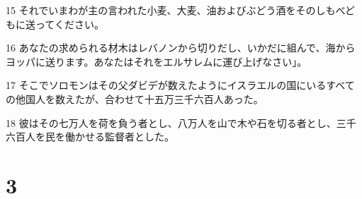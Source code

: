 \par 15 それでいまわが主の言われた小麦、大麦、油およびぶどう酒をそのしもべどもに送ってください。
\par 16 あなたの求められる材木はレバノンから切りだし、いかだに組んで、海からヨッパに送ります。あなたはそれをエルサレムに運び上げなさい」。
\par 17 そこでソロモンはその父ダビデが数えたようにイスラエルの国にいるすべての他国人を数えたが、合わせて十五万三千六百人あった。
\par 18 彼はその七万人を荷を負う者とし、八万人を山で木や石を切る者とし、三千六百人を民を働かせる監督者とした。

\chapter{3}

